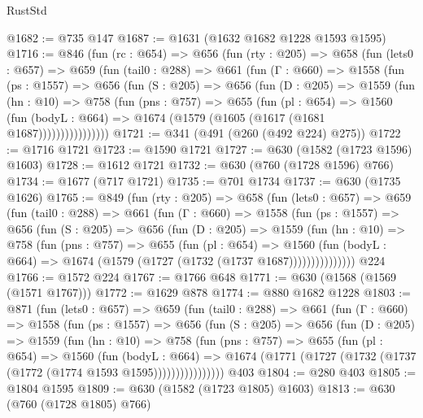 \begin{lexlean}{RustStd}
\begin{coremodule}
@1682 := @735 @147
@1687 := @1631 (@1632 @1682 @1228 @1593 @1595)
@1716 := @846
    (fun (rc : @654) =>
    @656
      (fun (rty : @205) =>
      @658
        (fun (lets0 : @657) =>
        @659
          (fun (tail0 : @288) =>
          @661
            (fun (Γ : @660) =>
            @1558
              (fun (ps : @1557) =>
              @656
                (fun (S : @205) =>
                @656
                  (fun (D : @205) =>
                  @1559
                    (fun (hn : @10) =>
                    @758
                      (fun (pns : @757) =>
                      @655
                        (fun (pl : @654) =>
                        @1560
                          (fun (bodyL : @664) =>
                          @1674 (@1579 (@1605 (@1617 (@1681 @1687))))))))))))))))
@1721 := @341 (@491 (@260 (@492 @224) @275))
@1722 := @1716 @1721
@1723 := @1590 @1721
@1727 := @630 (@1582 (@1723 @1596) @1603)
@1728 := @1612 @1721
@1732 := @630 (@760 (@1728 @1596) @766)
@1734 := @1677 (@717 @1721)
@1735 := @701 @1734
@1737 := @630 (@1735 @1626)
@1765 := @849
    (fun (rty : @205) =>
    @658
      (fun (lets0 : @657) =>
      @659
        (fun (tail0 : @288) =>
        @661
          (fun (Γ : @660) =>
          @1558
            (fun (ps : @1557) =>
            @656
              (fun (S : @205) =>
              @656
                (fun (D : @205) =>
                @1559
                  (fun (hn : @10) =>
                  @758
                    (fun (pns : @757) =>
                    @655
                      (fun (pl : @654) =>
                      @1560
                        (fun (bodyL : @664) =>
                        @1674 (@1579 (@1727 (@1732 (@1737 @1687)))))))))))))))
    @224
@1766 := @1572 @224
@1767 := @1766 @648
@1771 := @630 (@1568 (@1569 (@1571 @1767)))
@1772 := @1629 @878
@1774 := @880 @1682 @1228
@1803 := @871
    (fun (lets0 : @657) =>
    @659
      (fun (tail0 : @288) =>
      @661
        (fun (Γ : @660) =>
        @1558
          (fun (ps : @1557) =>
          @656
            (fun (S : @205) =>
            @656
              (fun (D : @205) =>
              @1559
                (fun (hn : @10) =>
                @758
                  (fun (pns : @757) =>
                  @655
                    (fun (pl : @654) =>
                    @1560
                      (fun (bodyL : @664) =>
                      @1674 (@1771 (@1727 (@1732 (@1737 (@1772 (@1774 @1593 @1595))))))))))))))))
    @403
@1804 := @280 @403
@1805 := @1804 @1595
@1809 := @630 (@1582 (@1723 @1805) @1603)
@1813 := @630 (@760 (@1728 @1805) @766)

\end{coremodule}
\end{lexlean}
